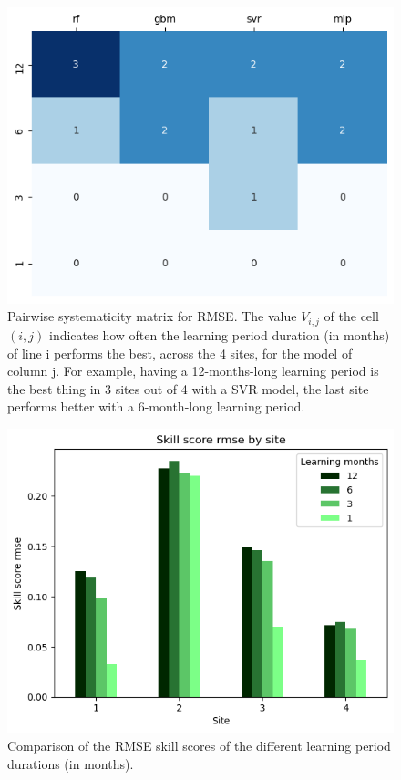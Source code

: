 \begin{figure}[htb!]
    \centering
    \includegraphics[width=\columnwidth]{figures/first_study/comp_learning_period_rmse.png}
\caption{Pairwise systematicity matrix for RMSE. The value $V_{i,j}$ of the cell $(i,j)$ indicates how often the learning period duration (in months) of line i performs the best, across the 4 sites, for the model of column j. For example, having a 12-months-long learning period is the best thing in 3 sites out of 4 with a SVR model, the last site performs better with a 6-month-long learning period.}
\end{figure}

\begin{figure}[htb!]
    \centering
    \includegraphics[width=\columnwidth]{figures/first_study/comp_learning_period_rmse_mlp.png}
\caption{Comparison of the RMSE skill scores of the different learning period durations (in months).}
\end{figure}


